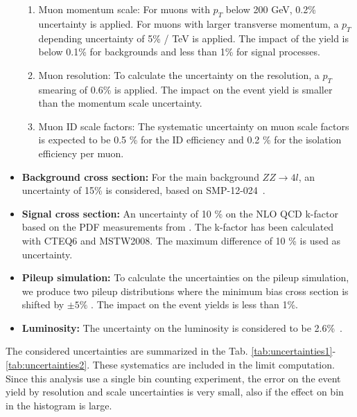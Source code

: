 \begin{itemize}
		\begin{enumerate}
			\item Muon momentum scale: For muons with $p_{T}$ below 200 GeV, 0.2\% uncertainty is applied. For muons with larger transverse momentum, a $p_{T}$ depending uncertainty of 5\% / TeV \cite{muonresol} is applied. The impact of the yield is below 0.1\% for backgrounds and less than 1\% for signal processes.  
			\item Muon resolution: To calculate the uncertainty on the resolution, a $p_{T}$ smearing of 0.6\% \cite{muonresol} is applied. The impact on the event yield is smaller than the momentum scale uncertainty.  
			\item Muon ID scale factors: The systematic uncertainty on muon scale factors is expected to be 0.5 \% for the ID efficiency and 0.2 \% for the isolation efficiency per muon. 
		\end{enumerate}
 	\item \textbf{Background cross section:} For the main background $ZZ\rightarrow 4l$, an uncertainty of 15\% is considered, based on SMP-12-024~\cite{SMP-12-024}.
 	\item \textbf{Signal cross section:} An uncertainty of 10 \% on the NLO QCD k-factor based on the PDF measurements from \cite{kfactor}. The k-factor has been calculated with CTEQ6 and MSTW2008. The maximum difference of 10 \% is used as uncertainty.
	\item \textbf{Pileup simulation:} To calculate the uncertainties on the pileup simulation, we produce two pileup distributions where the minimum bias cross section is 
shifted by $\pm 5\%$ \cite{pileupsyst}. The impact on the event yields is less than 1\%.  
	\item \textbf{Luminosity:} The uncertainty on the luminosity is considered to be 2.6\%~\cite{lumi001}.
\end{itemize}

The considered uncertainties are summarized in the Tab. \ref{tab:uncertainties1}-\ref{tab:uncertainties2}. These systematics are included in the limit computation. Since this analysis use a single bin counting experiment, the error on the event yield by resolution and scale uncertainties is very small, also if the effect on bin in the histogram is large.

